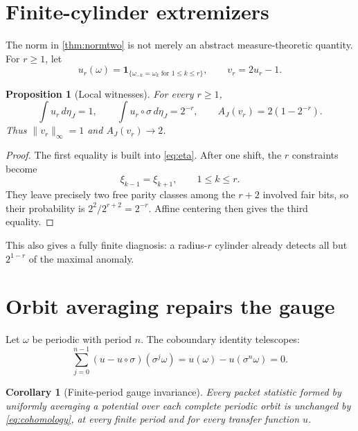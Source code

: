 \documentclass[11pt]{article}
\newtheorem{proposition}[theorem]{Proposition}
\newtheorem{corollary}[theorem]{Corollary}
\newcommand{\one}{\mathbf 1}
\begin{document}
\section{Finite-cylinder extremizers}

The norm in \cref{thm:normtwo} is not merely an abstract measure-theoretic
quantity.  For $r\geq1$, let
\begin{equation}\label{eq:ur}
 u_r(\omega)=\one_{\{\omega_{-k}=\omega_k\;\text{for }1\leq k\leq r\}},
 \qquad v_r=2u_r-1.
\end{equation}

\begin{proposition}[Local witnesses]\label{prop:witness}
For every $r\geq1$,
\begin{equation}\label{eq:witness}
 \int u_r\,d\eta_J=1,
 \qquad
 \int u_r\circ\sigma\,d\eta_J=2^{-r},
 \qquad
 A_J(v_r)=2(1-2^{-r}).
\end{equation}
Thus $\lVert v_r\rVert_\infty=1$ and $A_J(v_r)\to2$.
\end{proposition}

\begin{proof}
The first equality is built into \eqref{eq:eta}.  After one shift, the $r$
constraints become
\[
 \xi_{k-1}=\xi_{k+1},\qquad 1\leq k\leq r.
\]
They leave precisely two free parity classes among the $r+2$ involved fair
bits, so their probability is $2^2/2^{r+2}=2^{-r}$.  Affine centering then
gives the third equality.
\end{proof}

This also gives a fully finite diagnosis: a radius-$r$ cylinder already
detects all but $2^{1-r}$ of the maximal anomaly.

\section{Orbit averaging repairs the gauge}

Let $\omega$ be periodic with period $n$.  The coboundary identity telescopes:
\begin{equation}\label{eq:telescoping}
 \sum_{j=0}^{n-1}(u-u\circ\sigma)(\sigma^j\omega)
 =u(\omega)-u(\sigma^n\omega)=0.
\end{equation}

\begin{corollary}[Finite-period gauge invariance]\label{cor:orbit}
Every packet statistic formed by uniformly averaging a potential over each
complete periodic orbit is unchanged by \eqref{eq:cohomology}, at every
finite period and for every transfer function $u$.
\end{corollary}
\end{document}
